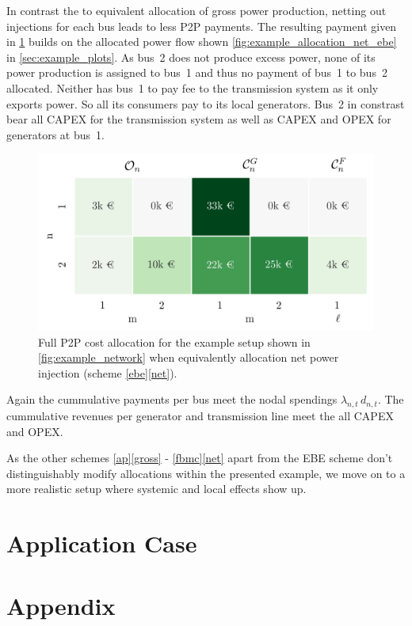 \documentclass[11pt,twocolumn]{article}
\newcommand{\demand}[1][n]{d_{#1,t}}
\newcommand{\lmp}[1][n]{\lambda_{#1,t}}
\begin{document}
In contrast the to equivalent allocation of gross power production, netting out injections for each bus leads to less P2P payments. The resulting payment given in \cref{fig:example_payoff_net_ebe} builds on the allocated power flow shown \cref{fig:example_allocation_net_ebe} in \cref{sec:example_plots}. As bus~2 does not produce excess power, none of its power production is assigned to bus~1 and thus no payment of bus~1 to bus~2 allocated. Neither has bus~1 to pay fee to the transmission system as it only exports power. So all its consumers pay to its local generators. Bus~2 in constrast bear all CAPEX for the transmission system as well as CAPEX and OPEX for generators at bus~1.
\begin{figure}[h]
\centering
\includegraphics[width=\linewidth]{example_payoff_net_ebe.png}
\caption{Full P2P cost allocation for the example setup shown in \cref{fig:example_network} when equivalently allocation net power injection (scheme \ref{ebe}\ref{net}).}
\label{fig:example_payoff_net_ebe}
\end{figure}

Again the cummulative payments per bus meet the nodal spendings $\lmp \, \demand$. The cummulative revenues per generator and transmission line meet the all CAPEX and OPEX.  

As the other schemes \ref{ap}\ref{gross} - \ref{fbmc}\ref{net} apart from the EBE scheme don't distinguishably modify allocations within the presented example, we move on to a more realistic setup where systemic and local effects show up.


\section{Application Case}


\clearpage
\appendix

\section{Appendix}
\end{document}
